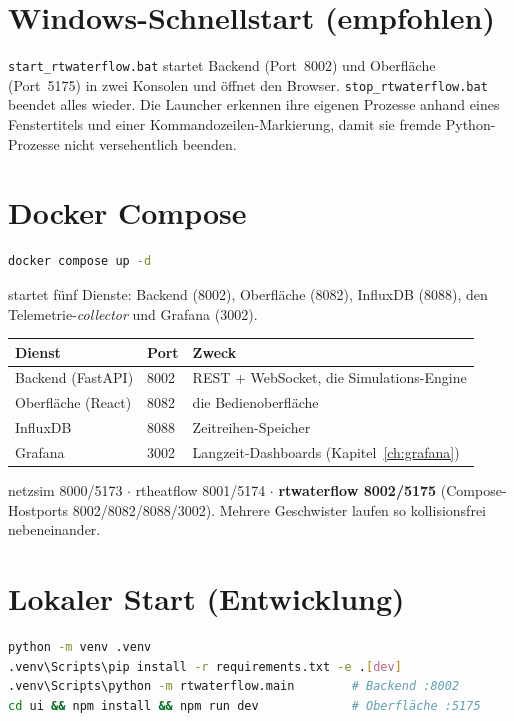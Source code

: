 \documentclass[11pt,a4paper,parskip=half]{scrreprt}
\newcommand{\file}[1]{\texttt{#1}}              %
\begin{document}
\section{Windows-Schnellstart (empfohlen)}

\file{start\_rtwaterflow.bat} startet Backend (Port~8002) und Oberfläche
(Port~5175) in zwei Konsolen und öffnet den Browser. \file{stop\_rtwaterflow.bat}
beendet alles wieder. Die Launcher erkennen ihre eigenen Prozesse anhand eines
Fenstertitels und einer Kommandozeilen-Markierung, damit sie fremde
Python-Prozesse nicht versehentlich beenden.

\section{Docker Compose}

\begin{lstlisting}[language=bash]
docker compose up -d
\end{lstlisting}

startet fünf Dienste: Backend (8002), Oberfläche (8082), InfluxDB (8088),
den Telemetrie-\emph{collector} und Grafana (3002).

\begin{center}
\begin{tabular}{@{}lll@{}}
\toprule
Dienst & Port & Zweck \\
\midrule
Backend (FastAPI) & 8002 & REST + WebSocket, die Simulations-Engine \\
Oberfläche (React) & 8082 & die Bedienoberfläche \\
InfluxDB & 8088 & Zeitreihen-Speicher \\
Grafana & 3002 & Langzeit-Dashboards (Kapitel~\ref{ch:grafana}) \\
\bottomrule
\end{tabular}
\end{center}

\begin{beispiel}
netzsim 8000/5173 $\cdot$ rtheatflow 8001/5174 $\cdot$ \textbf{rtwaterflow
8002/5175} (Compose-Hostports 8002/8082/8088/3002). Mehrere Geschwister laufen so
kollisionsfrei nebeneinander.
\end{beispiel}

\section{Lokaler Start (Entwicklung)}

\begin{lstlisting}[language=bash]
python -m venv .venv
.venv\Scripts\pip install -r requirements.txt -e .[dev]
.venv\Scripts\python -m rtwaterflow.main        # Backend :8002
cd ui && npm install && npm run dev             # Oberfläche :5175
\end{lstlisting}
\end{document}
